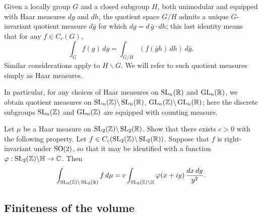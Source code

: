 \documentclass[reqno]{amsart} 
\begin{document}
Given a locally group $G$ and a closed subgroup $H$, both unimodular and equipped with Haar measures $d g$ and $d h$, the quotient space $G/H$ admits a unique $G$-invariant quotient measure $d \bar{g}$ for which $d g = d \, \bar{g} \cdot d h$; this last identity means that for any $f \in C_c(G)$,
\begin{equation*}
  \int _{G} f(g) \, d g = \int _{G/H} \left( f(\bar{g} h) \, d h \right) \, d \bar{g}.
\end{equation*}
Similar considerations apply to $H \backslash G$.  We will refer to such quotient measures simply as Haar measures.

In particular, for any choices of Haar measures on $\operatorname{SL}_n(\mathbb{R})$ and $\operatorname{GL}_n(\mathbb{R})$, we obtain quotient measures on $\operatorname{SL}_n(\mathbb{Z}) \backslash \operatorname{SL}_n(\mathbb{R})$, $\operatorname{GL}_n(\mathbb{Z}) \backslash \operatorname{GL}_n(\mathbb{R})$; here the discrete subgroups $\operatorname{SL}_n(\mathbb{Z})$ and $\operatorname{GL}_n(\mathbb{Z})$ are equipped with counting measure.

\begin{exercise}\label{exe:2}
  Let $\mu$ be a Haar measure on $\operatorname{SL}_2(\mathbb{Z}) \backslash \operatorname{SL}_2(\mathbb{R})$.  Show that there exists $c > 0$ with the following property.  Let $f \in C_c(\operatorname{SL}_2(\mathbb{Z}) \backslash \operatorname{SL}_2(\mathbb{R}))$.  Suppose that $f$ is right-invariant under $\operatorname{SO}(2)$, so that it may be identified with a function $\varphi : \operatorname{SL}_2(\mathbb{Z}) \backslash \mathbb{H} \rightarrow \mathbb{C}$.  Then
  \begin{equation}\label{eq:int_sl_2m-backsl-sl_}
    \int_{\operatorname{SL}_2(\mathbb{Z}) \backslash \operatorname{SL}_2(\mathbb{R})} f \, d \mu
    =
    c
    \int _{\operatorname{SL}_2(\mathbb{Z}) \backslash \mathbb{H} }
    \varphi(x + i y) \, \frac{d x \, d y}{y^2}.
  \end{equation}
\end{exercise}


\subsection{Finiteness of the volume}
\label{sec:finiteness-volume}
\end{document}

